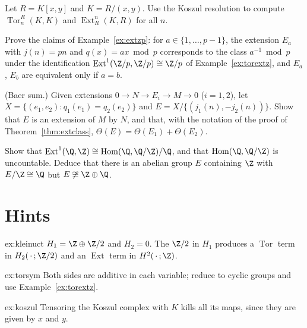 \begin{exercise}[$\star\star$]\label{ex:koszul}
Let $R=K[x,y]$ and $K=R/(x,y)$. Use the Koszul resolution to compute $\operatorname{Tor}_n^R(K,K)$ and $\operatorname{Ext}^n_R(K,R)$ for all $n$.
\end{exercise}

\begin{exercise}[$\star\star$]\label{ex:extzp2}
Prove the claims of Example~\ref{ex:extzp}: for $a\in\{1,\dots,p-1\}$, the extension $E_a$ with $j(n)=pn$ and $q(x)=ax\bmod p$ corresponds to the class $a^{-1}\bmod p$ under the identification $\operatorname{Ext}^1(\Z/p,\Z/p)\cong\Z/p$ of Example~\ref{ex:torextz}, and $E_a$, $E_b$ are equivalent only if $a=b$.
\end{exercise}

\begin{exercise}[$\star\star$]\label{ex:baersum}
(Baer sum.) Given extensions $0\to N\to E_i\to M\to0$ ($i=1,2$), let $X=\{(e_1,e_2):q_1(e_1)=q_2(e_2)\}$ and $E=X/\{(j_1(n),-j_2(n))\}$. Show that $E$ is an extension of $M$ by $N$, and that, with the notation of the proof of
Theorem~\ref{thm:extclass}, $\Theta(E)=\Theta(E_1)+\Theta(E_2)$.
\end{exercise}

\begin{exercise}[$\star\star\star$]\label{ex:extqz}
Show that $\operatorname{Ext}^1(\Q,\Z)\cong\operatorname{Hom}(\Q,\Q/\Z)/\Q$, and that $\operatorname{Hom}(\Q,\Q/\Z)$ is uncountable. Deduce that there is an abelian group $E$ containing $\Z$ with $E/\Z\cong\Q$ but $E\not\cong\Z\oplus\Q$.
\end{exercise}

\section{Hints}

\begin{hint}{ex:kleinuct}
$H_1=\Z\oplus\Z/2$ and $H_2=0$. The $\Z/2$ in $H_1$ produces a $\operatorname{Tor}$ term in $H_2(\,\cdot\,;\Z/2)$ and an $\operatorname{Ext}$ term in $H^2(\,\cdot\,;\Z)$.
\end{hint}

\begin{hint}{ex:torsym}
Both sides are additive in each variable; reduce to cyclic groups and use Example~\ref{ex:torextz}.
\end{hint}

\begin{hint}{ex:koszul}
Tensoring the Koszul complex with $K$ kills all its maps, since they are given by $x$ and $y$.
\end{hint}


